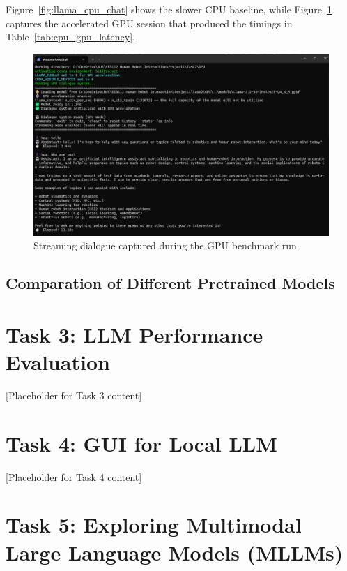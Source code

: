 \documentclass[12pt,a4paper]{article}
\begin{document}
Figure~\ref{fig:llama_cpu_chat} shows the slower CPU baseline, while Figure~\ref{fig:llama_gpu_chat} captures the accelerated GPU session that produced the timings in Table~\ref{tab:cpu_gpu_latency}.

\begin{figure}[H]
    \centering
    \includegraphics[width=1\linewidth]{Figures/llamaGPU.png}
    \caption{Streaming dialogue captured during the GPU benchmark run.}
    \label{fig:llama_gpu_chat}
\end{figure}

\subsection{Comparation of Different Pretrained Models}

\section{Task 3: LLM Performance Evaluation}

[Placeholder for Task 3 content]

\section{Task 4: GUI for Local LLM}

[Placeholder for Task 4 content]

\section{Task 5: Exploring Multimodal Large Language Models (MLLMs)}
\end{document}
